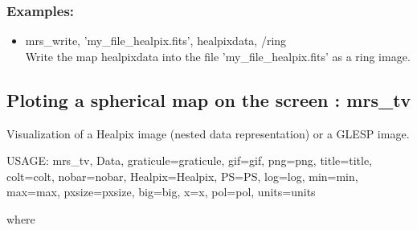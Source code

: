 \subsubsection*{Examples:} 
\begin{itemize}
\item mrs\_write, 'my\_file\_healpix.fits', healpixdata, /ring \\
Write the map healpixdata into the file 'my\_file\_healpix.fits' as a ring image.
\end{itemize}



\subsection{Ploting a spherical map on the screen : mrs\_tv}
Visualization of a Healpix image (nested data representation) or a GLESP image.
{\bf
\begin{center}
     USAGE: mrs\_tv, Data, graticule=graticule, gif=gif, png=png, title=title, colt=colt, nobar=nobar, 
     Healpix=Healpix, PS=PS, log=log, min=min, max=max, pxsize=pxsize, big=big, x=x, pol=pol, units=units
\end{center}}
where
